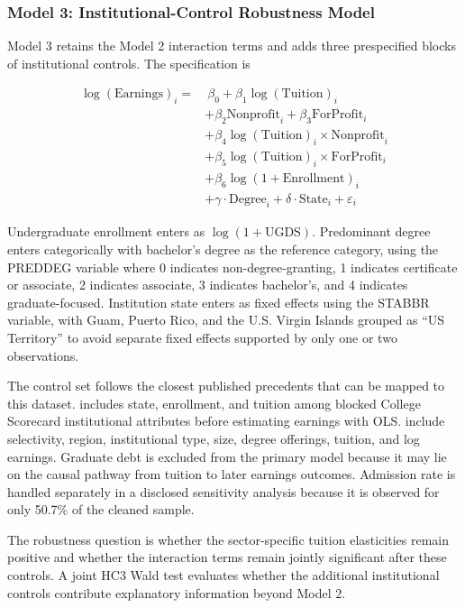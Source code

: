 \subsubsection{Model 3: Institutional-Control Robustness Model}

Model 3 retains the Model 2 interaction terms and adds three prespecified blocks of institutional controls. The specification is

\[
\begin{aligned}
\log(\text{Earnings})_i = &\ \beta_0 + \beta_1 \log(\text{Tuition})_i \\
&+ \beta_2 \text{Nonprofit}_i + \beta_3 \text{ForProfit}_i \\
&+ \beta_4 \log(\text{Tuition})_i \times \text{Nonprofit}_i \\
&+ \beta_5 \log(\text{Tuition})_i \times \text{ForProfit}_i \\
&+ \beta_6 \log(1 + \text{Enrollment})_i \\
&+ \gamma \cdot \text{Degree}_i + \delta \cdot \text{State}_i + \varepsilon_i
\end{aligned}
\]

Undergraduate enrollment enters as $\log(1 + \text{UGDS})$. Predominant degree enters categorically with bachelor's degree as the reference category, using the PREDDEG variable where 0 indicates non-degree-granting, 1 indicates certificate or associate, 2 indicates associate, 3 indicates bachelor's, and 4 indicates graduate-focused. Institution state enters as fixed effects using the STABBR variable, with Guam, Puerto Rico, and the U.S. Virgin Islands grouped as ``US Territory'' to avoid separate fixed effects supported by only one or two observations.

The control set follows the closest published precedents that can be mapped to this dataset. \textcite[pp.~42--45]{faber2017} includes state, enrollment, and tuition among blocked College Scorecard institutional attributes before estimating earnings with OLS. \textcite[pp.~36--40]{muse2024} include selectivity, region, institutional type, size, degree offerings, tuition, and log earnings. Graduate debt is excluded from the primary model because it may lie on the causal pathway from tuition to later earnings outcomes. Admission rate is handled separately in a disclosed sensitivity analysis because it is observed for only 50.7\% of the cleaned sample.

The robustness question is whether the sector-specific tuition elasticities remain positive and whether the interaction terms remain jointly significant after these controls. A joint HC3 Wald test evaluates whether the additional institutional controls contribute explanatory information beyond Model 2.

